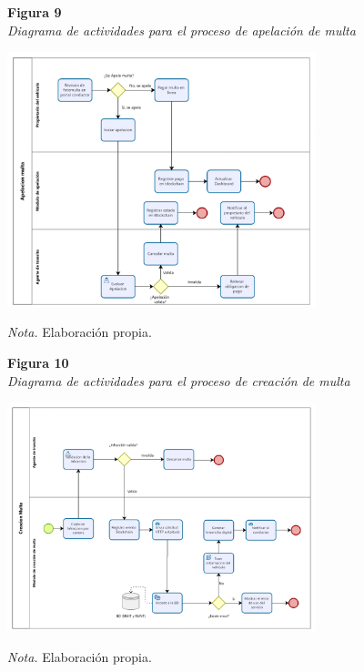 \documentclass[
    letterpaper, 
    man,   
    spanish,
    12pt,
    donotrepeattitle,
    floatsintext,
    hidelinks %
]{apa7}
\begin{document}
\begin{figure}[htbp]
    \begin{flushleft}
        \textbf{Figura 9}\\
        \textit{Diagrama de actividades para el proceso de apelación de multa}
    \end{flushleft}
    \centering
    \includegraphics[width=0.8\textwidth]{Images/ActApelacion.png}
    \vspace{0.5em}
    \begin{flushleft}
        \textit{Nota.} Elaboración propia.
    \end{flushleft}
    \label{fig:diagrama_apelacion}
\end{figure}

\begin{figure}[htbp]
    \begin{flushleft}
        \textbf{Figura 10}\\
        \textit{Diagrama de actividades para el proceso de creación de multa}
    \end{flushleft}
    \centering
    \includegraphics[width=0.8\textwidth]{Images/ActMulta.png}
    \vspace{0.5em}
    \begin{flushleft}
        \textit{Nota.} Elaboración propia.
    \end{flushleft}
    \label{fig:diagrama_creacion_multa}
\end{figure}
\end{document}

